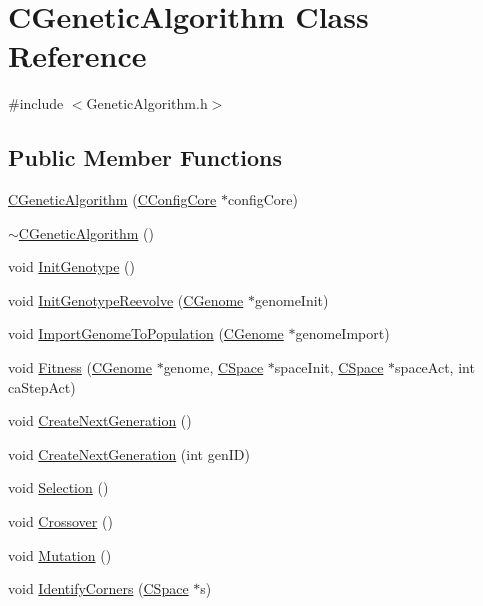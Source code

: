 \hypertarget{classCGeneticAlgorithm}{
\section{CGeneticAlgorithm Class Reference}
\label{classCGeneticAlgorithm}
}


{\ttfamily \#include $<$GeneticAlgorithm.h$>$}\subsection*{Public Member Functions}
\begin{DoxyCompactItemize}
\item 
\hyperlink{classCGeneticAlgorithm_a08e490f073f3f053004347361436a192}{CGeneticAlgorithm} (\hyperlink{classCConfigCore}{CConfigCore} $\ast$configCore)
\item 
\hyperlink{classCGeneticAlgorithm_a6d5d96bde33bb3b14795f100b01e08a9}{$\sim$CGeneticAlgorithm} ()
\item 
void \hyperlink{classCGeneticAlgorithm_a9632fcef92f6ec52112f971cb5119bc2}{InitGenotype} ()
\item 
void \hyperlink{classCGeneticAlgorithm_a239027b6bfc2af7443d73645479ec293}{InitGenotypeReevolve} (\hyperlink{classCGenome}{CGenome} $\ast$genomeInit)
\item 
void \hyperlink{classCGeneticAlgorithm_a0992c75f2578fa1aec75996805e463cb}{ImportGenomeToPopulation} (\hyperlink{classCGenome}{CGenome} $\ast$genomeImport)
\item 
void \hyperlink{classCGeneticAlgorithm_a354d08a200d57940cfabf5b935b2809c}{Fitness} (\hyperlink{classCGenome}{CGenome} $\ast$genome, \hyperlink{classCSpace}{CSpace} $\ast$spaceInit, \hyperlink{classCSpace}{CSpace} $\ast$spaceAct, int caStepAct)
\item 
void \hyperlink{classCGeneticAlgorithm_a6d5ea989deb69d8ee444db30d6e7fe67}{CreateNextGeneration} ()
\item 
void \hyperlink{classCGeneticAlgorithm_a790cc40ce38ec37681cf5f5a7c169915}{CreateNextGeneration} (int genID)
\item 
void \hyperlink{classCGeneticAlgorithm_a44c7a724b1af1370d1e669c84f30775f}{Selection} ()
\item 
void \hyperlink{classCGeneticAlgorithm_a8a74507a0e02509a46e31377772d0399}{Crossover} ()
\item 
void \hyperlink{classCGeneticAlgorithm_a032d168728e17a9ac47f81844a529410}{Mutation} ()
\item 
void \hyperlink{classCGeneticAlgorithm_ad11b5c30a2eb45b1a8526ef058b1c8d0}{IdentifyCorners} (\hyperlink{classCSpace}{CSpace} $\ast$s)

\end{DoxyCompactItemize}
